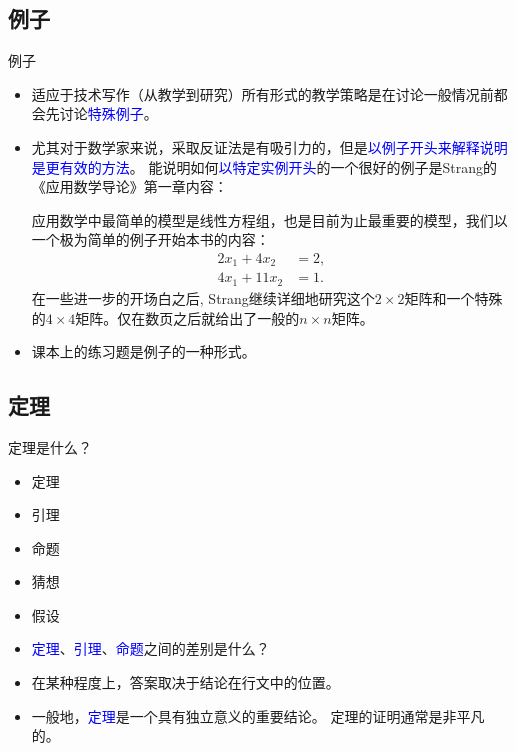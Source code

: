 \documentclass[13pt]{ctexbeamer}
\newcommand{\blue}[1]{\textcolor{blue}{#1}}
\begin{document}
\subsection{例子}

\begin{frame}{例子}
	\begin{itemize}
		\item 
		适应于技术写作（从教学到研究）所有形式的教学策略是在讨论一般情况前都会先讨论\blue{特殊例子}。
		\item 
		尤其对于数学家来说，采取反证法是有吸引力的，但是\blue{以例子开头来解释说明是更有效的方法}。
		能说明如何\blue{以特定实例开头}的一个很好的例子是Strang的《应用数学导论》第一章内容：
		
		{\small
			应用数学中最简单的模型是线性方程组，也是目前为止最重要的模型，我们以一个极为简单的例子开始本书的内容：
			\begin{align*}
				2 x_1+ 4 x_2& =2,\\
				4 x_1 +11x_2 & =1.
			\end{align*}
			在一些进一步的开场白之后, Strang继续详细地研究这个$2\times 2$矩阵和一个特殊的$4\times 4$矩阵。仅在数页之后就给出了一般的$n \times n$矩阵。}
		
		\item 课本上的\alert{练习题}是例子的一种形式。
	\end{itemize}
	
	
\end{frame}




\subsection{定理}
\begin{frame}{定理是什么？}

	
\begin{itemize}
	\item 定理
	\item 引理
	\item 命题
	\item 猜想
	\item 假设
\end{itemize}
\end{frame}

\begin{frame}
\begin{itemize}
\item \blue{定理}、\blue{引理}、\blue{命题}之间的差别是什么？
\item 在某种程度上，答案取决于结论在行文中的位置。
\item 
一般地，\blue{定理}是一个具有独立意义的重要结论。
定理的证明通常是非平凡的。


\end{itemize}
\end{frame}
\end{document}
